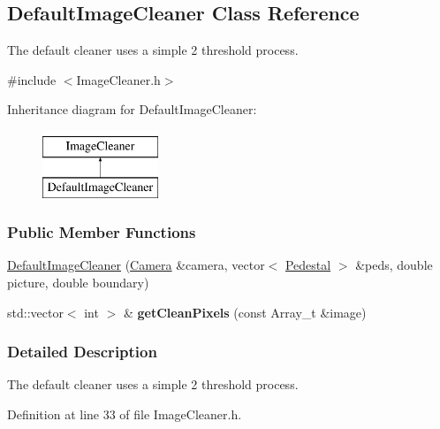 \hypertarget{classDefaultImageCleaner}{
\subsection{DefaultImageCleaner Class Reference}
\label{classDefaultImageCleaner}
}


The default cleaner uses a simple 2 threshold process.  




{\ttfamily \#include $<$ImageCleaner.h$>$}

Inheritance diagram for DefaultImageCleaner:\begin{figure}[H]
\begin{center}
\leavevmode
\includegraphics[height=2.000000cm]{classDefaultImageCleaner}
\end{center}
\end{figure}
\subsubsection*{Public Member Functions}
\begin{DoxyCompactItemize}
\item 
\hyperlink{classDefaultImageCleaner_af029b40ac6974bf0b3196c67bc5b34a0}{DefaultImageCleaner} (\hyperlink{classCamera}{Camera} \&camera, vector$<$ \hyperlink{structPedestal}{Pedestal} $>$ \&peds, double picture, double boundary)
\item 
\hypertarget{classDefaultImageCleaner_ae8b9d57c8aff0ffe07be81ee04b92255}{
std::vector$<$ int $>$ \& {\bfseries getCleanPixels} (const Array\_\-t \&image)}
\label{classDefaultImageCleaner_ae8b9d57c8aff0ffe07be81ee04b92255}

\end{DoxyCompactItemize}


\subsubsection{Detailed Description}
The default cleaner uses a simple 2 threshold process. 

Definition at line 33 of file ImageCleaner.h.



